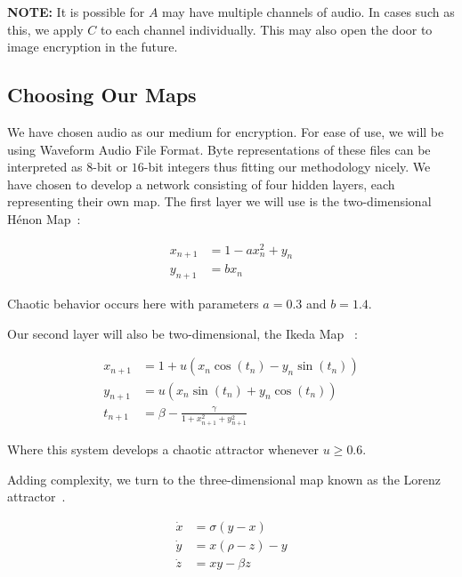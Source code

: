 \documentclass[conference]{IEEEtran}
\begin{document}
\begin{mdframed}
\textbf{NOTE:} It is possible for $A$ may have multiple channels of audio.
In cases such as this, we apply $C$ to each channel individually.
This may also open the door to image encryption in the future.
\end{mdframed}

\subsection{Choosing Our Maps}\label{subsec:choosing-our-maps}

We have chosen audio as our medium for encryption.
For ease of use, we will be using Waveform Audio File Format.
Byte representations of these files can be interpreted as $8$-bit or $16$-bit integers thus fitting our methodology nicely.
We have chosen to develop a network consisting of four hidden layers, each representing their own map.
The first layer we will use is the two-dimensional Hénon Map~\cite{Hamdy}:

\begin{equation}\label{eq:Henon}
\begin{aligned}
    x_{n+1} &= 1 - ax_n^2 + y_n \\
    y_{n+1} &= bx_n
\end{aligned}
\end{equation}

\noindent Chaotic behavior occurs here with parameters $a=0.3$ and $b=1.4$.

Our second layer will also be two-dimensional, the Ikeda Map~\cite{app112110190} :

\begin{equation}\label{eq:Ikeda}
\begin{aligned}
    x_{n+1} &= 1 + u(x_n \cos(t_n) - y_n \sin(t_n))\\
    y_{n+1} &= u(x_n \sin(t_n) + y_n \cos(t_n))\\
    t_{n+1} &= \beta - \frac{\gamma}{1+x_{n+1}^2+y_{n+1}^2}
\end{aligned}
\end{equation}


\noindent Where this system develops a chaotic attractor whenever $u\ge0.6$.

Adding complexity, we turn to the three-dimensional map known as the Lorenz attractor~\cite{Naik2022}.

\begin{equation}\label{eq:Lorenz}
\begin{aligned}
    \dot{x} &= \sigma (y - x)\\
    \dot{y} &= x (\rho - z) - y\\
    \dot{z} &= xy - \beta z
\end{aligned}
\end{equation}
\end{document}
